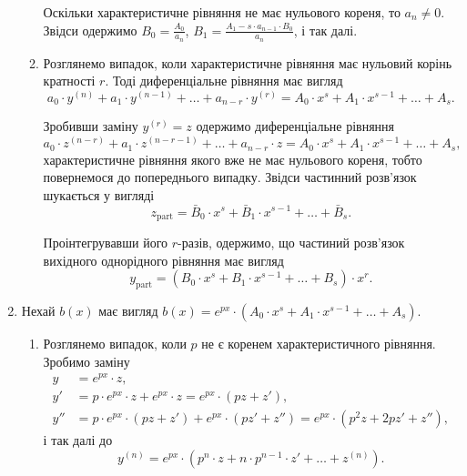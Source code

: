 \begin{enumerate}
\begin{enumerate}
		Оскільки характеристичне рівняння не має нульового кореня, то $a_n \ne 0$. Звідси одержимо $B_0 = \frac{A_0}{a_n}$, $B_1 = \frac{A_1 - s \cdot a_{n - 1} \cdot B_0}{a_n}$, і так далі.

		\item Розглянемо випадок, коли характеристичне рівняння має нульовий корінь кратності $r$. Тоді диференціальне рівняння має вигляд
		\begin{equation*}
			a_0 \cdot y^{(n)} + a_1 \cdot y^{(n - 1)} + \ldots + a_{n - r} \cdot y^{(r)} = A_0 \cdot x^s + A_1 \cdot x^{s - 1} + \ldots + A_s.
		\end{equation*}

		Зробивши заміну $y^{(r)} = z$ одержимо диференціальне рівняння 
		\begin{equation*}
			a_0 \cdot z^{(n - r)} + a_1 \cdot z^{(n - r - 1)} + \ldots + a_{n - r} \cdot z = A_0 \cdot x^s + A_1 \cdot x^{s - 1} + \ldots + A_s,
		\end{equation*}
		характеристичне рівняння якого вже не має нульового кореня, тобто повернемося до попереднього випадку. Звідси частинний розв’язок шукається у вигляді
		\begin{equation*}
			z_{\text{part}} = \bar B_0 \cdot x^s + \bar B_1 \cdot x^{s - 1} + \ldots + \bar B_s.
		\end{equation*}

 		Проінтегрувавши його $r$-разів, одержимо, що частиний роз\-в'яз\-ок вихідного однорідного рівняння має вигляд
 		\begin{equation*}
			y_{\text{part}} = \left(B_0 \cdot x^s + B_1 \cdot x^{s - 1} + \ldots + B_s\right) \cdot x^r.
		\end{equation*}
 	\end{enumerate}
	\item Нехай $b(x)$ має вигляд $b(x) = e^{px} \cdot \left( A_0 \cdot x^s + A_1 \cdot x^{s - 1} + \ldots + A_s \right)$.
	\begin{enumerate}
		\item Розглянемо випадок, коли $p$ не є коренем характеристичного рівняння. Зробимо заміну
		\begin{align*}
			y &= e^{p x} \cdot z, \\
			y' &= p \cdot e^{p x} \cdot z + e^{p x} \cdot z = e^{p x} \cdot (p z + z'), \\
			y'' &= p \cdot e^{p x} \cdot (p z + z') + e^{p x} \cdot (p z' + z'') = e^{p x} \cdot (p^2 z + 2 p z' + z''),
		\end{align*}
 		і так далі до
 		\begin{equation*}
 			y^{(n)} = e^{p x} \cdot \left( p^n \cdot z + n \cdot p^{n - 1} \cdot z' + \ldots + z^{(n)} \right).
 		\end{equation*}
		

\end{enumerate}
\end{enumerate}
